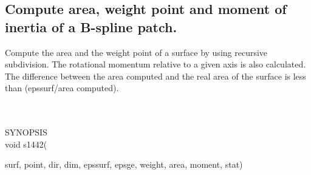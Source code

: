 \subsection{Compute area, weight point and moment of inertia of a B-spline patch.}
\begin{minipg1}
Compute the area and the weight point of a surface by using recursive 
subdivision. The rotational momentum relative to  a given axis is also 
calculated. The difference between the area computed and the real area of the 
surface is less than (epssurf/area computed).
\end{minipg1} \\ \\
SYNOPSIS\\
	\>void s1442(\begin{minipg3}
			{\fov surf}, {\fov point}, {\fov dir}, {\fov dim}, {\fov epssurf}, {\fov epsge}, {\fov weight}, {\fov area}, 	
			{\fov moment}, {\fov stat})
		\end{minipg3}\\[0.3ex]

